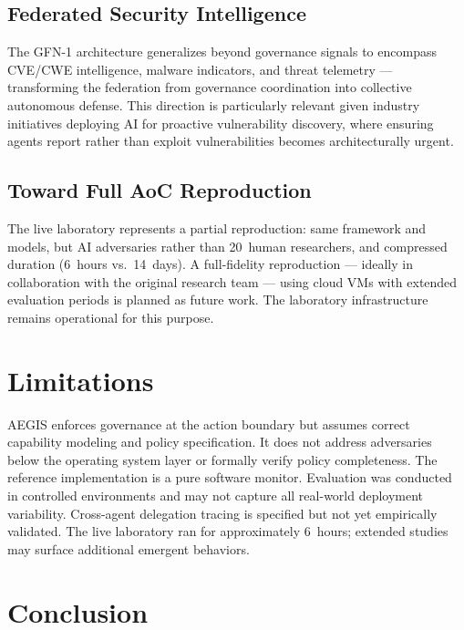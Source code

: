 \documentclass[journal]{IEEEtran}
\begin{document}
\subsection{Federated Security Intelligence}

The GFN-1 architecture generalizes beyond governance signals to encompass CVE/CWE intelligence, malware indicators, and threat telemetry --- transforming the federation from governance coordination into collective autonomous defense. This direction is particularly relevant given industry initiatives deploying AI for proactive vulnerability discovery, where ensuring agents report rather than exploit vulnerabilities becomes architecturally urgent.

\subsection{Toward Full AoC Reproduction}

The live laboratory represents a partial reproduction: same framework and models, but AI adversaries rather than 20~human researchers, and compressed duration (6~hours vs.\ 14~days). A full-fidelity reproduction --- ideally in collaboration with the original research team --- using cloud VMs with extended evaluation periods is planned as future work. The laboratory infrastructure remains operational for this purpose.

\section{Limitations}

AEGIS enforces governance at the action boundary but assumes correct capability modeling and policy specification. It does not address adversaries below the operating system layer or formally verify policy completeness. The reference implementation is a pure software monitor. Evaluation was conducted in controlled environments and may not capture all real-world deployment variability. Cross-agent delegation tracing is specified but not yet empirically validated. The live laboratory ran for approximately 6~hours; extended studies may surface additional emergent behaviors.

\section{Conclusion}
\end{document}
